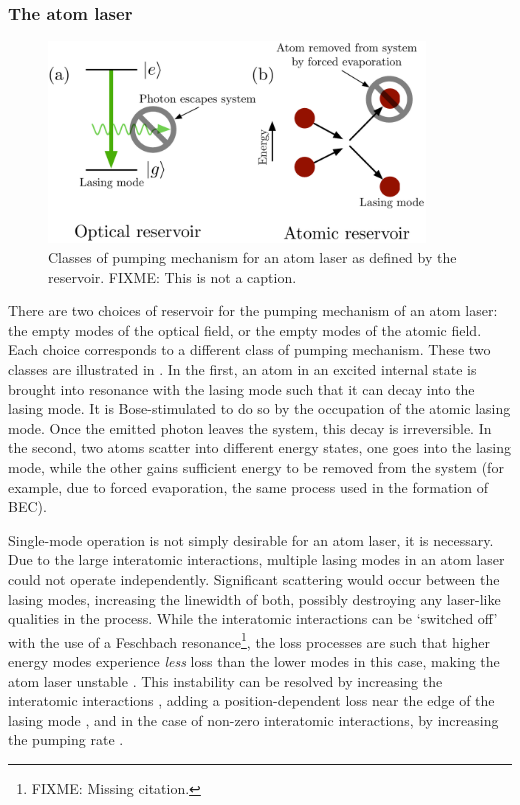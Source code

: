 \subsubsection{The atom laser}

\begin{figure}
    \centering
    \includegraphics[width=10cm]{ReservoirChoices}
    \caption{
        \label{Introduction:ReservoirChoices}
        Classes of pumping mechanism for an atom laser as defined by the reservoir. FIXME: This is not a caption.
    }
\end{figure}

There are two choices of reservoir for the pumping mechanism of an atom laser: the empty modes of the optical field, or the empty modes of the atomic field.  Each choice corresponds to a different class of pumping mechanism.  These two classes are illustrated in .  In the first, an atom in an excited internal state is brought into resonance with the lasing mode such that it can decay into the lasing mode.  It is Bose-stimulated to do so by the occupation of the atomic lasing mode.  Once the emitted photon leaves the system, this decay is irreversible.  In the second, two atoms scatter into different energy states, one goes into the lasing mode, while the other gains sufficient energy to be removed from the system (for example, due to forced evaporation, the same process used in the formation of BEC).

Single-mode operation is not simply desirable for an atom laser, it is necessary.  Due to the large interatomic interactions, multiple lasing modes in an atom laser could not operate independently.  Significant scattering would occur between the lasing modes, increasing the linewidth of both, possibly destroying any laser-like qualities in the process.  While the interatomic interactions can be `switched off' with the use of a Feschbach resonance\footnote{FIXME: Missing citation.}, the loss processes are such that higher energy modes experience \emph{less} loss than the lower modes in this case, making the atom laser unstable \citep{Haine:2002kp}.  This instability can be resolved by increasing the interatomic interactions \citep{Haine:2002kp}, adding a position-dependent loss near the edge of the lasing mode \citep{Kneer:1998fk}, and in the case of non-zero interatomic interactions, by increasing the pumping rate \citep{Robins:2001pd}.


